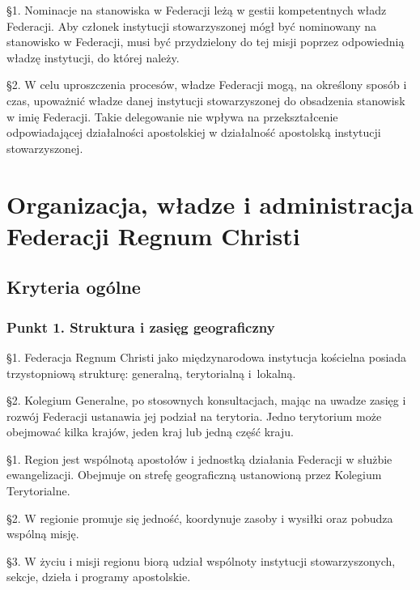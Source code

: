  
 \S{}1. Nominacje na stanowiska w Federacji leżą w gestii kompetentnych władz Federacji. Aby członek instytucji stowarzyszonej mógł być nominowany na stanowisko w Federacji, musi być przydzielony do tej misji poprzez odpowiednią władzę instytucji, do której należy.


\S{}2. W celu uproszczenia procesów, władze Federacji mogą, na określony sposób i czas, upoważnić władze danej instytucji stowarzyszonej do obsadzenia stanowisk w imię Federacji. Takie delegowanie nie wpływa na przekształcenie odpowiadającej działalności apostolskiej w działalność apostolską instytucji stowarzyszonej.
 


 \part{Organizacja, władze i administracja\\Federacji Regnum Christi}


 \chapter{Kryteria ogólne}


\section{Punkt 1. Struktura i zasięg geograficzny}


 
 \S{}1. Federacja Regnum Christi jako międzynarodowa instytucja kościelna posiada trzystopniową strukturę: generalną, terytorialną \mbox{i lokalną}.


\S{}2. Kolegium Generalne, po stosownych konsultacjach, mając na uwadze zasięg i rozwój Federacji ustanawia jej podział na terytoria. Jedno terytorium może obejmować kilka krajów, jeden kraj lub jedną część kraju.
 
 
 \S{}1. Region jest wspólnotą apostołów i jednostką działania Federacji w służbie ewangelizacji. Obejmuje on strefę geograficzną ustanowioną przez Kolegium Terytorialne.


\S{}2. W regionie promuje się  jedność, koordynuje zasoby i wysiłki oraz pobudza wspólną misję.


\S{}3. W życiu i misji regionu biorą udział wspólnoty instytucji stowarzyszonych, sekcje, dzieła i programy apostolskie. 


